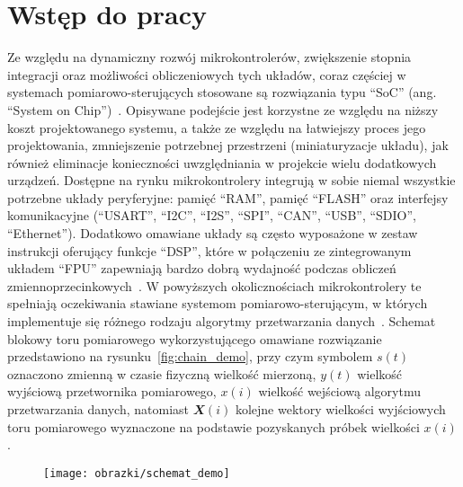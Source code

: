\chapter{Wstęp do pracy}

Ze względu na dynamiczny rozwój mikrokontrolerów, zwiększenie stopnia integracji oraz możliwości obliczeniowych tych układów, coraz częściej w systemach pomiarowo-sterujących stosowane są rozwiązania typu \enquote{SoC} (ang. \enquote{System on Chip})~\cite{saleh_systemonchip}. Opisywane podejście jest korzystne ze względu na niższy koszt projektowanego systemu, a także ze względu na łatwiejszy proces jego projektowania, zmniejszenie potrzebnej przestrzeni (miniaturyzacje układu), jak również eliminacje konieczności uwzględniania w projekcie wielu dodatkowych urządzeń. Dostępne na rynku mikrokontrolery integrują w sobie niemal wszystkie potrzebne układy peryferyjne: pamięć \enquote{RAM}, pamięć \enquote{FLASH} oraz interfejsy komunikacyjne (\enquote{USART}, \enquote{I2C}, \enquote{I2S}, \enquote{SPI}, \enquote{CAN}, \enquote{USB}, \enquote{SDIO}, \enquote{Ethernet}). Dodatkowo omawiane układy są często wyposażone w zestaw instrukcji oferujący funkcje \enquote{DSP}, które w połączeniu ze zintegrowanym układem \enquote{FPU} zapewniają bardzo dobrą wydajność podczas obliczeń zmiennoprzecinkowych~\cite{reay_dsp}. W powyższych okolicznościach mikrokontrolery te spełniają oczekiwania stawiane systemom pomiarowo-sterującym, w których implementuje się różnego rodzaju algorytmy przetwarzania danych~\cite{saleh_systemonchip}. Schemat blokowy toru pomiarowego wykorzystującego omawiane rozwiązanie przedstawiono na rysunku~\ref{fig:chain_demo}, przy czym symbolem $s(t)$ oznaczono zmienną w czasie fizyczną wielkość mierzoną, $y(t)$ wielkość wyjściową przetwornika pomiarowego, $x(i)$ wielkość wejściową algorytmu przetwarzania danych, natomiast $\mathbfit{X}(i)$ kolejne wektory wielkości wyjściowych toru pomiarowego wyznaczone na podstawie pozyskanych próbek wielkości $x(i)$.

\begin{figure}[htb!]
\begin{center}
\texttt{[image: obrazki/schemat\_demo]}
\end{center}
\end{figure}

